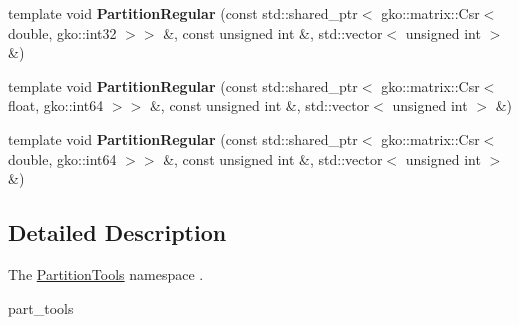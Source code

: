 \begin{DoxyCompactItemize}
\mbox{\label{namespaceSchwarzWrappers_1_1PartitionTools_ac828260c2caac950081ab035b447324c}} 
template void {\bfseries Partition\+Regular} (const std\+::shared\+\_\+ptr$<$ gko\+::matrix\+::\+Csr$<$ double, gko\+::int32 $>$$>$ \&, const unsigned int \&, std\+::vector$<$ unsigned int $>$ \&)
\item 
\mbox{\label{namespaceSchwarzWrappers_1_1PartitionTools_a5847ee2fea7c764bfd0f42d303a0a65f}} 
template void {\bfseries Partition\+Regular} (const std\+::shared\+\_\+ptr$<$ gko\+::matrix\+::\+Csr$<$ float, gko\+::int64 $>$$>$ \&, const unsigned int \&, std\+::vector$<$ unsigned int $>$ \&)
\item 
\mbox{\label{namespaceSchwarzWrappers_1_1PartitionTools_a6f50947e415a9bf033ce791bd6a315f2}} 
template void {\bfseries Partition\+Regular} (const std\+::shared\+\_\+ptr$<$ gko\+::matrix\+::\+Csr$<$ double, gko\+::int64 $>$$>$ \&, const unsigned int \&, std\+::vector$<$ unsigned int $>$ \&)
\end{DoxyCompactItemize}


\subsection{Detailed Description}
The \hyperlink{namespaceSchwarzWrappers_1_1PartitionTools}{Partition\+Tools} namespace . 

part\+\_\+tools 